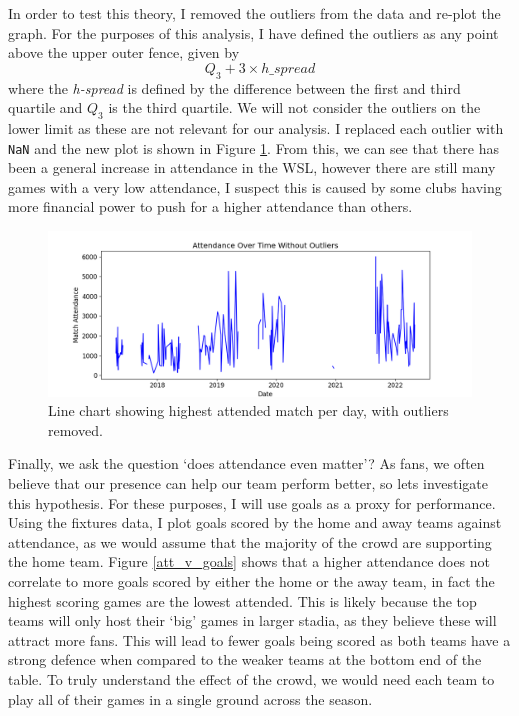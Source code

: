 \documentclass[12pt, a4paper, twocolumn]{article}
\begin{document}
In order to test this theory, I removed the outliers from the data and re-plot the graph. For the purposes of this analysis, I have defined the outliers as any point above the upper outer fence, given by
\begin{equation}
 Q_3 + 3 \times h\_spread
\end{equation}
where the \textit{h-spread} is defined by the difference between the first and third quartile and $Q_3$ is the third quartile. We will not consider the outliers on the lower limit as these are not relevant for our analysis. I replaced each outlier with \verb|NaN| and the new plot is shown in Figure \ref{att_ot_noout}. From this, we can see that there has been a general increase in attendance in the WSL, however there are still many games with a very low attendance, I suspect this is caused by some clubs having more financial power to push for a higher attendance than others.

\begin{figure}
  \includegraphics[width=\linewidth]{../vis/fixtures/attendance_overtime_no_outliers.png}
  \caption{Line chart showing highest attended match per day, with outliers removed.}
  \label{att_ot_noout}
\end{figure}

Finally, we ask the question `does attendance even matter'? As fans, we often believe that our presence can help our team perform better, so lets investigate this hypothesis. For these purposes, I will use goals as a proxy for performance. Using the fixtures data, I plot goals scored by the home and away teams against attendance, as we would assume that the majority of the crowd are supporting the home team. Figure \ref{att_v_goals} shows that a higher attendance does not correlate to more goals scored by either the home or the away team, in fact the highest scoring games are the lowest attended. This is likely because the top teams will only host their `big' games in larger stadia, as they believe these will attract more fans. This will lead to fewer goals being scored as both teams have a strong defence when compared to the weaker teams at the bottom end of the table. To truly understand the effect of the crowd, we would need each team to play all of their games in a single ground across the season.
\end{document}
